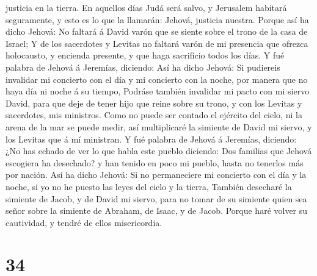 justicia en la tierra.  En aquellos días Judá será salvo,
y Jerusalem habitará seguramente, y esto es lo que la llamarán: Jehová,
justicia nuestra.  Porque así ha dicho Jehová: No faltará
á David varón que se siente sobre el trono de la casa de Israel;
 Y de los sacerdotes y Levitas no faltará varón de mi
presencia que ofrezca holocausto, y encienda presente, y que haga
sacrificio todos los días.  Y fué palabra de Jehová á
Jeremías, diciendo:  Así ha dicho Jehová: Si pudiereis
invalidar mi concierto con el día y mi concierto con la noche, por
manera que no haya día ni noche á su tiempo,  Podráse
también invalidar mi pacto con mi siervo David, para que deje de tener
hijo que reine sobre su trono, y con los Levitas y sacerdotes, mis
ministros.  Como no puede ser contado el ejército del
cielo, ni la arena de la mar se puede medir, así multiplicaré la
simiente de David mi siervo, y los Levitas que á mí ministran.
 Y fué palabra de Jehová á Jeremías, diciendo:
 ¿No has echado de ver lo que habla este pueblo diciendo:
Dos familias que Jehová escogiera ha desechado? y han tenido en poco mi
pueblo, hasta no tenerlos más por nación.  Así ha dicho
Jehová: Si no permaneciere mi concierto con el día y la noche, si yo no
he puesto las leyes del cielo y la tierra,  También
desecharé la simiente de Jacob, y de David mi siervo, para no tomar de
su simiente quien sea señor sobre la simiente de Abraham, de Isaac, y de
Jacob. Porque haré volver su cautividad, y tendré de ellos misericordia.

\hypertarget{section-33}{%
\section{34}\label{section-33}}

